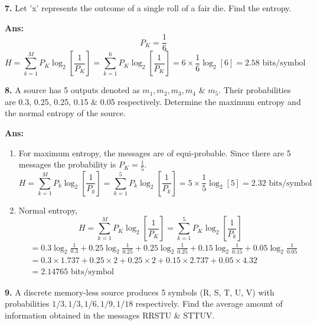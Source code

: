 \documentclass[12pt]{article}
\begin{document}
\textbf{7.} Let 'x' represents the outcome of a single roll of a fair die. Find the entropy.

\textbf{Ans:}
$$P_K = \frac{1}{6}$$
$$H = \sum_{k=1}^{M} P_K \log_2 \left[ \frac{1}{P_K} \right] = \sum_{k=1}^{6} P_K \log_2 \left[ \frac{1}{P_K} \right] = 6 \times \frac{1}{6} \log_2[6] = 2.58 \text{ bits/symbol}$$

\vspace{0.5cm}
\noindent \textbf{8.} A source has 5 outputs denoted as $m_1, m_2, m_3, m_4$ \& $m_5$. Their probabilities are 0.3, 0.25, 0.25, 0.15 \& 0.05 respectively. Determine the maximum entropy and the normal entropy of the source.

\textbf{Ans:}
\begin{enumerate}
	\item[i.] For maximum entropy, the messages are of equi-probable. Since there are 5 messages the probability is $P_K = \frac{1}{5}$.
	      $$H = \sum_{k=1}^{M} P_k \log_2 \left[ \frac{1}{P_k} \right] = \sum_{k=1}^{5} P_k \log_2 \left[ \frac{1}{P_k} \right] = 5 \times \frac{1}{5} \log_2[5] = 2.32 \text{ bits/symbol}$$

	\item[ii.] Normal entropy,
	      $$H = \sum_{k=1}^{M} P_K \log_2 \left[ \frac{1}{P_K} \right] = \sum_{k=1}^{5} P_K \log_2 \left[ \frac{1}{P_k} \right]$$
	      \begin{align*}
		       & = 0.3 \log_2 \frac{1}{0.3} + 0.25 \log_2 \frac{1}{0.25} + 0.25 \log_2 \frac{1}{0.25} + 0.15 \log_2 \frac{1}{0.15} + 0.05 \log_2 \frac{1}{0.05} \\
		       & = 0.3 \times 1.737 + 0.25 \times 2 + 0.25 \times 2 + 0.15 \times 2.737 + 0.05 \times 4.32                                                      \\
		       & = 2.14765 \text{ bits/symbol}
	      \end{align*}
\end{enumerate}

\vspace{0.5cm}
\noindent \textbf{9.} A discrete memory-less source produces 5 symbols (R, S, T, U, V) with probabilities $1/3, 1/3, 1/6, 1/9, 1/18$ respectively. Find the average amount of information obtained in the messages RRSTU \& STTUV.
\end{document}
